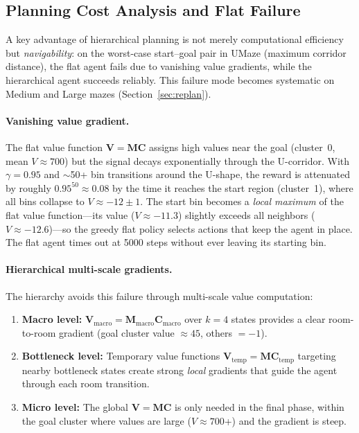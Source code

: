 \documentclass[11pt,a4paper]{article}
\newcommand{\M}{\mathbf{M}}
\newcommand{\C}{\mathbf{C}}
\newcommand{\V}{\mathbf{V}}
\newcommand{\Mmacro}{\M_{\text{macro}}}
\newcommand{\Cmacro}{\C_{\text{macro}}}
\newcommand{\Vmacro}{\V_{\text{macro}}}
\begin{document}
\subsection{Planning Cost Analysis and Flat Failure}
\label{sec:planning_cost}

A key advantage of hierarchical planning is not merely computational efficiency but \emph{navigability}: on the worst-case start--goal pair in UMaze (maximum corridor distance), the flat agent fails due to vanishing value gradients, while the hierarchical agent succeeds reliably.
This failure mode becomes systematic on Medium and Large mazes (Section~\ref{sec:replan}).

\paragraph{Vanishing value gradient.}
The flat value function $\V = \M\C$ assigns high values near the goal (cluster~0, mean $V \approx 700$) but the signal decays exponentially through the U-corridor.
With $\gamma = 0.95$ and $\sim$50+ bin transitions around the U-shape, the reward is attenuated by roughly $0.95^{50} \approx 0.08$ by the time it reaches the start region (cluster~1), where all bins collapse to $V \approx -12 \pm 1$.
The start bin becomes a \emph{local maximum} of the flat value function---its value ($V \approx -11.3$) slightly exceeds all neighbors ($V \approx -12.6$)---so the greedy flat policy selects actions that keep the agent in place.
The flat agent times out at 5000 steps without ever leaving its starting bin.

\paragraph{Hierarchical multi-scale gradients.}
The hierarchy avoids this failure through multi-scale value computation:
\begin{enumerate}[noitemsep]
    \item \textbf{Macro level:} $\Vmacro = \Mmacro \Cmacro$ over $k = 4$ states provides a clear room-to-room gradient (goal cluster value $\approx 45$, others $= -1$).
    \item \textbf{Bottleneck level:} Temporary value functions $\V_{\text{temp}} = \M \C_{\text{temp}}$ targeting nearby bottleneck states create strong \emph{local} gradients that guide the agent through each room transition.
    \item \textbf{Micro level:} The global $\V = \M\C$ is only needed in the final phase, within the goal cluster where values are large ($V \approx 700$+) and the gradient is steep.
\end{enumerate}
\end{document}
